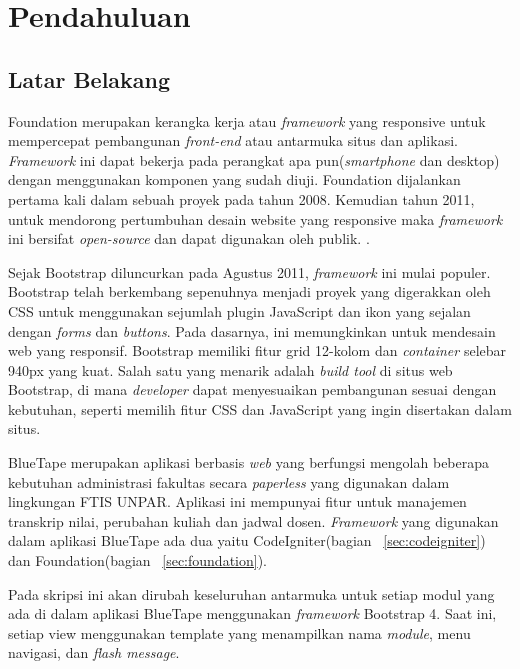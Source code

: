 \chapter{Pendahuluan}
\label{chap:intro}
   
\section{Latar Belakang}
\label{sec:label}
\par Foundation merupakan kerangka kerja atau \textit{framework} yang responsive untuk mempercepat pembangunan \textit{front-end} atau antarmuka situs dan aplikasi. \textit{Framework} ini dapat bekerja pada perangkat apa pun(\textit{smartphone} dan desktop) dengan menggunakan komponen yang sudah diuji. Foundation dijalankan pertama kali dalam sebuah proyek pada tahun 2008. Kemudian tahun 2011, untuk mendorong pertumbuhan desain website yang responsive maka \textit{framework} ini bersifat \textit{open-source} dan dapat digunakan oleh publik.
\cite{zurbfoundation:17}.
\par Sejak Bootstrap diluncurkan pada Agustus 2011, \textit{framework} ini mulai populer. Bootstrap telah berkembang sepenuhnya menjadi proyek yang digerakkan oleh CSS untuk menggunakan sejumlah plugin JavaScript dan ikon yang sejalan dengan \textit{forms} dan \textit{buttons}. Pada dasarnya, ini memungkinkan untuk mendesain web yang responsif. Bootstrap memiliki fitur grid 12-kolom dan \textit{container} selebar 940px yang kuat. Salah satu yang menarik adalah \textit{build tool} di situs web Bootstrap, di mana \textit{developer} dapat menyesuaikan pembangunan sesuai dengan kebutuhan, seperti memilih fitur CSS dan JavaScript yang ingin disertakan dalam situs. \cite{bootstrap:19}
\par BlueTape merupakan aplikasi berbasis \textit{web} yang berfungsi mengolah beberapa kebutuhan administrasi fakultas secara \textit{paperless} yang digunakan dalam lingkungan FTIS UNPAR.  Aplikasi ini mempunyai fitur untuk manajemen transkrip nilai, perubahan kuliah dan jadwal dosen. \textit{Framework} yang digunakan dalam aplikasi BlueTape ada dua yaitu CodeIgniter(bagian ~\ref{sec:codeigniter}) dan Foundation(bagian ~\ref{sec:foundation}).
\par Pada skripsi ini akan dirubah keseluruhan  antarmuka untuk setiap modul yang ada di dalam aplikasi BlueTape menggunakan \textit{framework} Bootstrap 4. Saat ini, setiap view menggunakan template yang menampilkan nama \textit{module}, menu navigasi, dan \textit{flash message}.


